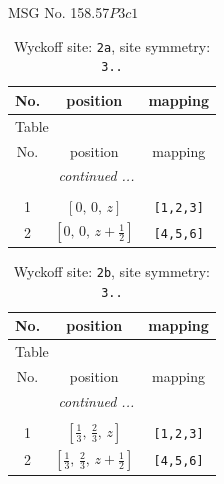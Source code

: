 \documentclass[fleqn,8pt]{jsarticle}
\begin{document}
\setcounter{MaxMatrixCols}{32}

\renewcommand{\tablename}{Table~}
\renewcommand{\figurename}{Figure~}
\begin{center}
\LARGE
MSG No. 158.57\quad$P3c1$
\end{center}
\renewcommand{\arraystretch}{1.2}
\begin{longtable}{ccc}
\caption{Wyckoff site: {\tt 2a}, site symmetry: {\tt 3..}}
 \\
 \hline \hline
No. & position & mapping \\ \hline \endfirsthead

\multicolumn{2}{l}{\tablename\ \thetable{}} \\
 \hline \hline
No. & position & mapping \\ \hline \endhead

 \hline \hline
\multicolumn{2}{r}{\footnotesize\it continued ...} \\ \endfoot

 \hline \hline
\multicolumn{2}{r}{} \\ \endlastfoot

1 & $\left[ 0,\, 0,\, z \right]$ & {\tt [1,2,3]} \\ \hline
2 & $\left[ 0,\, 0,\, z + \frac{1}{2} \right]$ & {\tt [4,5,6]} \\
\end{longtable}
\renewcommand{\arraystretch}{1.2}
\begin{longtable}{ccc}
\caption{Wyckoff site: {\tt 2b}, site symmetry: {\tt 3..}}
 \\
 \hline \hline
No. & position & mapping \\ \hline \endfirsthead

\multicolumn{2}{l}{\tablename\ \thetable{}} \\
 \hline \hline
No. & position & mapping \\ \hline \endhead

 \hline \hline
\multicolumn{2}{r}{\footnotesize\it continued ...} \\ \endfoot

 \hline \hline
\multicolumn{2}{r}{} \\ \endlastfoot

1 & $\left[ \frac{1}{3},\, \frac{2}{3},\, z \right]$ & {\tt [1,2,3]} \\ \hline
2 & $\left[ \frac{1}{3},\, \frac{2}{3},\, z + \frac{1}{2} \right]$ & {\tt [4,5,6]} \\
\end{longtable}
\renewcommand{\arraystretch}{1.2}
\end{document}
